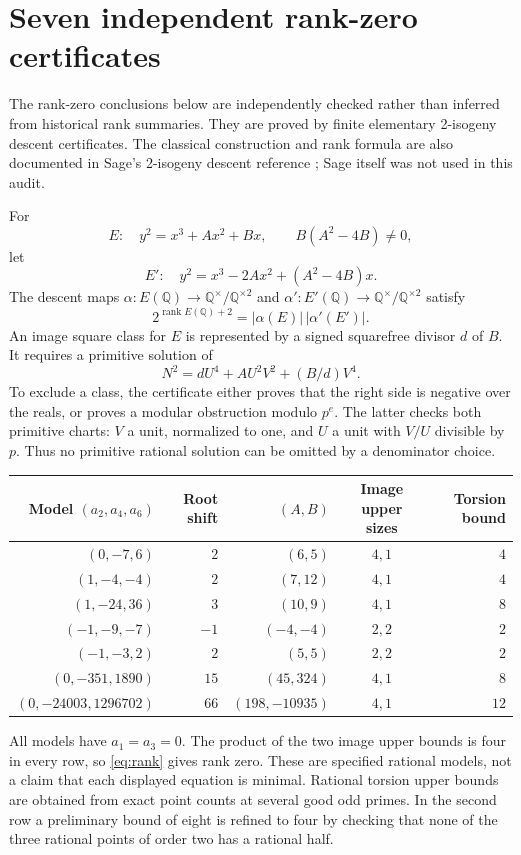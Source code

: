 \documentclass[11pt,letterpaper]{article}
\renewcommand{\arraystretch}{1.12}
\theoremstyle{definition}\newtheorem{definition}[theorem]{Definition}
\theoremstyle{remark}\newtheorem{remark}[theorem]{Remark}
\newcommand{\Q}{\mathbb Q}\newcommand{\Z}{\mathbb Z}\newcommand{\R}{\mathbb R}
\begin{document}
\section{Seven independent rank-zero certificates}\label{sec:rank}
The rank-zero conclusions below are independently checked rather than inferred from historical rank summaries. They are proved by finite elementary 2-isogeny descent certificates. The classical construction and rank formula are also documented in Sage's 2-isogeny descent reference \cite{SageDescent}; Sage itself was not used in this audit.

For
\[
E:\quad y^2=x^3+Ax^2+Bx,\qquad B(A^2-4B)\ne0,
\]
let
\[
E':\quad y^2=x^3-2Ax^2+(A^2-4B)x.
\]
The descent maps $\alpha:E(\Q)\to\Q^\times/\Q^{\times2}$ and $\alpha':E'(\Q)\to\Q^\times/\Q^{\times2}$ satisfy
\begin{equation}\label{eq:rank}
2^{\operatorname{rank}E(\Q)+2}=|\alpha(E)|\,|\alpha'(E')|.
\end{equation}
An image square class for $E$ is represented by a signed squarefree divisor $d$ of $B$. It requires a primitive solution of
\begin{equation}\label{eq:quarticdescent}
N^2=dU^4+A U^2V^2+(B/d)V^4.
\end{equation}
To exclude a class, the certificate either proves that the right side is negative over the reals, or proves a modular obstruction modulo $p^e$. The latter checks both primitive charts: $V$ a unit, normalized to one, and $U$ a unit with $V/U$ divisible by $p$. Thus no primitive rational solution can be omitted by a denominator choice.

\begin{center}
\small\renewcommand{\arraystretch}{1.16}\setlength{\tabcolsep}{5pt}
\begin{tabular}{rrrcr}
\toprule
Model $(a_2,a_4,a_6)$ & Root shift & $(A,B)$ & Image upper sizes & Torsion bound\\
\midrule
$(0,-7,6)$ & $2$ & $(6,5)$ & $4,1$ & $4$\\
$(1,-4,-4)$ & $2$ & $(7,12)$ & $4,1$ & $4$\\
$(1,-24,36)$ & $3$ & $(10,9)$ & $4,1$ & $8$\\
$(-1,-9,-7)$ & $-1$ & $(-4,-4)$ & $2,2$ & $2$\\
$(-1,-3,2)$ & $2$ & $(5,5)$ & $2,2$ & $2$\\
$(0,-351,1890)$ & $15$ & $(45,324)$ & $4,1$ & $8$\\
$(0,-24003,1296702)$ & $66$ & $(198,-10935)$ & $4,1$ & $12$\\
\bottomrule
\end{tabular}
\end{center}
All models have $a_1=a_3=0$. The product of the two image upper bounds is four in every row, so \eqref{eq:rank} gives rank zero. These are specified rational models, not a claim that each displayed equation is minimal. Rational torsion upper bounds are obtained from exact point counts at several good odd primes. In the second row a preliminary bound of eight is refined to four by checking that none of the three rational points of order two has a rational half.
\end{document}
